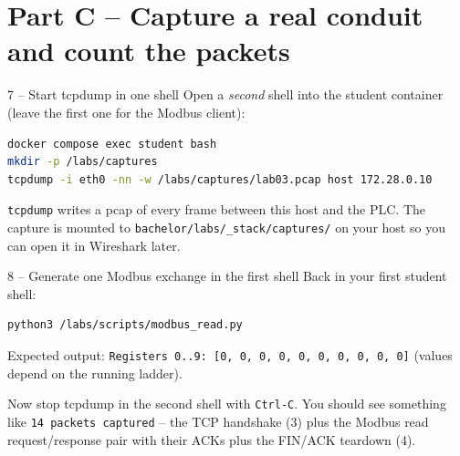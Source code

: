 \documentclass[11pt,a4paper]{article}
\begin{document}
\section*{Part C -- Capture a real conduit and count the packets}

\begin{stepbox}{7 -- Start tcpdump in one shell}
Open a \emph{second} shell into the student container (leave the first
one for the Modbus client):
\begin{lstlisting}[language=bash]
docker compose exec student bash
mkdir -p /labs/captures
tcpdump -i eth0 -nn -w /labs/captures/lab03.pcap host 172.28.0.10
\end{lstlisting}

\texttt{tcpdump} writes a pcap of every frame between this host and the
PLC. The capture is mounted to \texttt{bachelor/labs/\_stack/captures/}
on your host so you can open it in Wireshark later.
\end{stepbox}

\begin{stepbox}{8 -- Generate one Modbus exchange in the first shell}
Back in your first student shell:
\begin{lstlisting}[language=bash]
python3 /labs/scripts/modbus_read.py
\end{lstlisting}

Expected output: \texttt{Registers 0..9: [0, 0, 0, 0, 0, 0, 0, 0, 0, 0]}
(values depend on the running ladder).

Now stop tcpdump in the second shell with \texttt{Ctrl-C}. You should see
something like \texttt{14 packets captured} -- the TCP handshake (3) plus
the Modbus read request/response pair with their ACKs plus the FIN/ACK
teardown (4).
\end{stepbox}
\end{document}
